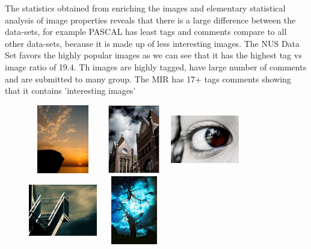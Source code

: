 The statistics obtained from enriching the images and elementary statistical analysis of image properties reveals that there is a large difference between the data-sets, for example PASCAL has least tags and comments compare to all other data-sets, because it is made up of less interesting images. The NUS Data Set favors the highly popular images as we can see that it has the highest tag vs image ratio of 19.4. Th  images are highly tagged, have large number of comments and are submitted to many group. The MIR has 17$+$ tags comments showing that it contains 'interesting images' \cite{MIR} \\
\begin{center}
\begin{figure}
\centering
\includegraphics[width=3cm, height=3cm]{./Pictures/CLEF/1.jpg}
\includegraphics[width=3cm, height=3cm]{./Pictures/CLEF/2.jpg}
\includegraphics[width=3cm, height=3cm]{./Pictures/CLEF/3.jpg} \\
\includegraphics[width=3cm, height=3cm]{./Pictures/CLEF/4.jpg}
\includegraphics[width=3cm, height=3cm]{./Pictures/CLEF/5.jpg}

\end{figure}
\end{center}
